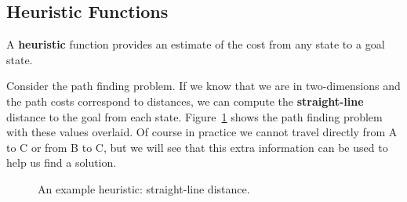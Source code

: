 \documentclass[10pt]{article}
\def\Graph{\path node(A)[draw, initial, state] at (-2, 1) {A};
    \path node(B)[draw, state] at (-1, 3) {B};
    \path node(C)[draw, state, accepting] at (4, 2) {C};
    \path node(D)[draw, state] at (1, 1) {D};
    \path node(E)[draw, state] at (2, 3) {E};
    \path[draw] (A) --node[xshift=-0.2cm]{2} (B); 
    \path[draw] (B) --node[yshift=0.2cm]{4} (E); 
    \path[draw] (A) --node[yshift=0.2cm]{3} (D); 
    \path[draw] (A) --node[yshift=0.2cm]{5} (E); 
    \path[draw] (D) --node[yshift=0.2cm]{4} (C); 
    \path[draw] (E) --node[yshift=0.2cm]{4} (C); 
}
\begin{document}
\subsection{Heuristic Functions}

A \textbf{heuristic} function provides an estimate of the cost from 
any state to a goal state.  

Consider the path finding problem. If we know that we are in
two-dimensions and the path costs correspond to distances, we can
compute the \textbf{straight-line} distance to the goal from each
state. Figure~\ref{fig:heu} shows the path finding problem with these
values overlaid. Of course in practice we cannot travel directly
from A to C or from B to C, but we will see that this extra
information can be used to help us find a solution.



\begin{figure}
  \centering

  \caption{\label{fig:heu} An example heuristic: straight-line distance.}
\end{figure}
\end{document}
